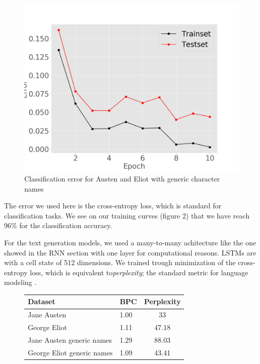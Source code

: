 \begin{figure}[ht]
\vskip 0.2in
\begin{center}
\centerline{\includegraphics[width=\columnwidth]{gejaclasswithout}}
\caption{Classification error for Austen and Eliot with generic character names}
\end{center}
\vskip -0.2in
\end{figure}
The error we used here is the cross-entropy loss, which is standard for 
classification tasks. We see on our training curves (figure 2) that we 
have reach 96\% for the classification accuracy.

For the text generation models, we used a many-to-many achitecture like 
the one showed in the RNN section with one layer for computational reasons.
LSTMs are with a cell state of 512 dimensions. We trained trough minimization 
of the cross-entropy loss, which is equivalent to\textit{perplexity}; the 
standard metric for language modeling \cite{gravesGenerating}.

\begin{figure}[htbp!]
\begin{tabular}{|l|l|c|}
\hline
Dataset & BPC & Perplexity \\
\hline
Jane Austen & 1.00 & 33 \\
George Eliot& 1.11 & 47.18 \\
Jane Austen generic names & 1.29  & 88.03 \\
George Eliot generic names & 1.09 & 43.41\\
\hline
\end{tabular}
\end{figure}



